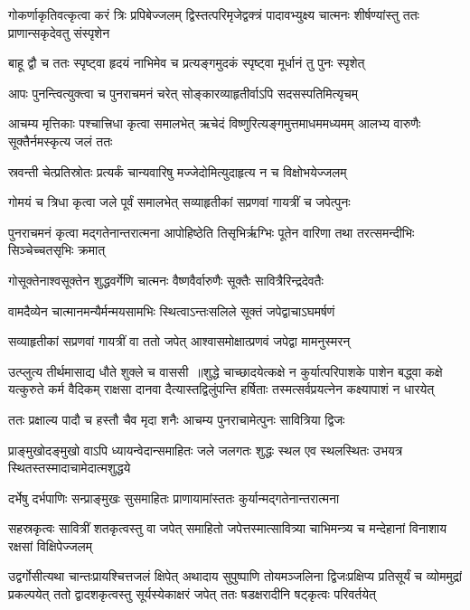 \threelineshloka
{गोकर्णाकृतिवत्कृत्वा करं त्रिः प्रपिबेज्जलम्}
{द्विस्तत्परिमृजेद्वक्त्रं पादावभ्युक्ष्य चात्मनः}
{शीर्षण्यांस्तु ततः प्राणान्सकृदेवतु संस्पृशेन}


\twolineshloka
{बाहू द्वौ च ततः स्पृष्ट्वा हृदयं नाभिमेव च}
{प्रत्यङ्गमुदकं स्पृष्ट्वा मूर्धानं तु पुनः स्पृशेत्}


\twolineshloka
{आपः पुनन्त्वित्युक्त्वा च पुनराचमनं चरेत्}
{सोङ्कारव्याहृतीर्वाऽपि सदसस्पतिमित्यृचम्}


\threelineshloka
{आचम्य मृत्तिकाः पश्चात्त्रिधा कृत्वा समालभेत्}
{ऋचेदं विष्णुरित्यङ्गमुत्तमाधममध्यमम्}
{आलभ्य वारुणैः सूक्तैर्नमस्कृत्य जलं ततः}


\twolineshloka
{स्रवन्ती चेत्प्रतिस्रोतः प्रत्यर्कं चान्यवारिषु}
{मज्जेदोमित्युदाहृत्य न च विक्षोभयेज्जलम्}


\twolineshloka
{गोमयं च त्रिधा कृत्वा जले पूर्वं समालभेत्}
{सव्याहृतीकां सप्रणवां गायत्रीं च जपेत्पुनः}


\threelineshloka
{पुनराचमनं कृत्वा मद्गतेनान्तरात्मना}
{आपोहिष्ठेति तिसृभिर्ऋग्भिः पूतेन वारिणा}
{तथा तरत्समन्दीभिः सिञ्चेच्चतसृभिः क्रमात्}


\twolineshloka
{गोसूक्तेनाश्वसूक्तेन शुद्धवर्गेणि चात्मनः}
{वैष्णवैर्वारुणैः सूक्तैः सावित्रैरिन्द्रदेवतैः}


\twolineshloka
{वामदैव्येन चात्मानमन्यैर्मन्मयसामभिः}
{स्थित्वाऽन्तःसलिले सूक्तं जपेद्वाचाऽघमर्षणं}


\twolineshloka
{सव्याहृतीकां सप्रणवां गायत्रीं वा ततो जपेत्}
{आश्वासमोक्षात्प्रणवं जपेद्वा मामनुस्मरन्}


उत्प्लुत्य तीर्थमासाद्य धौते शुक्ले च वाससी ॥शुद्धे चाच्छादयेत्कक्षे न कुर्यात्परिपाशके
\threelineshloka
{पाशेन बद्ध्वा कक्षे यत्कुरुते कर्म वैदिकम्}
{राक्षसा दानवा दैत्यास्तद्विलुंपन्ति हर्षिताः}
{तस्मत्सर्वप्रयत्नेन कक्ष्यापाशं न धारयेत्}


\twolineshloka
{ततः प्रक्षाल्य पादौ च हस्तौ चैव मृदा शनैः}
{आचम्य पुनराचामेत्पुनः सावित्रिया द्विजः}


\threelineshloka
{प्राङ्मुखोदङ्मुखो वाऽपि ध्यायन्वेदान्समाहितः}
{जले जलगतः शुद्धः स्थल एव स्थलस्थितः}
{उभयत्र स्थितस्तस्मादाचामेदात्मशुद्धये}


\twolineshloka
{दर्भेषु दर्भपाणिः सन्प्राङ्मुखः सुसमाहितः}
{प्राणायामांस्ततः कुर्यान्मद्गतेनान्तरात्मना}


सहस्रकृत्वः सावित्रीं शतकृत्वस्तु वा जपेत्
\twolineshloka
{समाहितो जपेत्तस्मात्सावित्र्या चाभिमन्त्र्य च}
{मन्देहानां विनाशाय रक्षसां विक्षिपेज्जलम्}


उद्वर्गोसीत्यथा चान्तःप्रायश्चित्तजलं क्षिपेत्
अथादाय सुपुष्पाणि तोयमञ्जलिना द्विजःप्रक्षिप्य प्रतिसूर्यं च व्योममुद्रां प्रकल्पयेत्
\twolineshloka
{ततो द्वादशकृत्वस्तु सूर्यस्येकाक्षरं जपेत्}
{ततः षडक्षरादीनि षट्कृत्वः परिवर्तयेत्}


